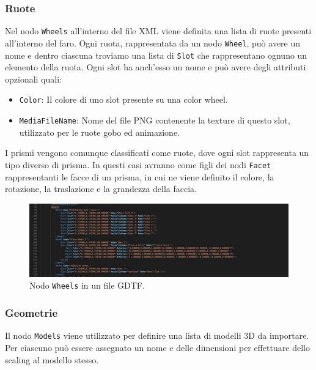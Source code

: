 \documentclass[main.tex]{subfiles}
\begin{document}
\subsubsection{Ruote}\label{subsec:1_2_wheels}
Nel nodo \lstinline{Wheels} all'interno del file XML viene definita una lista di ruote presenti all'interno del faro. Ogni ruota, rappresentata da un nodo \lstinline{Wheel}, può avere un nome e dentro ciascuna troviamo una lista di \lstinline{Slot} che rappresentano ognuno un elemento della ruota. Ogni slot ha anch'esso un nome e può avere degli attributi opzionali quali:
\begin{itemize}
    \item \lstinline{Color}: Il colore di uno slot presente su una color wheel.
    \item \lstinline{MediaFileName}: Nome del file PNG contenente la texture di questo slot, utilizzato per le ruote gobo ed animazione.
\end{itemize}
I prismi vengono comunque classificati come ruote, dove ogni slot rappresenta un tipo diverso di prisma. In questi casi avranno come figli dei nodi \lstinline{Facet} rappresentanti le facce di un prisma, in cui ne viene definito il colore, la rotazione, la traslazione e la grandezza della faccia.
\begin{figure}[H]
    \centering
    \includegraphics[width=1\linewidth]{img/introduzione/GDTFwheelExample.jpg}
    \caption{Nodo \lstinline{Wheels} in un file GDTF.}
    \label{fig:1_gdtfWheelExample}
\end{figure}

\subsubsection{Geometrie}\label{subsec:1_2_geometries}
Il nodo \lstinline{Models} viene utilizzato per definire una lista di modelli 3D da importare. Per ciascuno può essere assegnato un nome e delle dimensioni per effettuare dello scaling al modello stesso. 
\end{document}
